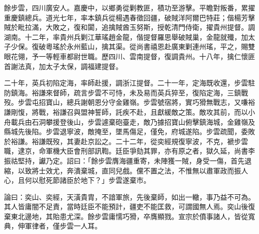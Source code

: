 \begin{pinyinscope}
餘步雲，四川廣安人。嘉慶中，以鄉勇從剿教匪，積功至游擊。平瞻對叛番，累擢重慶鎮總兵。道光七年，率本鎮兵從楊遇春徵回疆，破賊洋阿爾巴特莊；偕楊芳擊賊於毗拉滿，大敗之，復和闐，追擒賊酋玉努斯，授乾清門侍衛，擢貴州提督。調湖南。十二年，率貴州兵剿江華瑤趙金龍，偕提督羅思舉破賊巢，金龍就殲，加太子少保。復破粵瑤於永州藍山，擒其渠。從尚書禧恩赴廣東剿連州瑤，平之，賜雙眼花翎，予一等輕車都尉世職。歷四川、雲南提督，復調貴州。十八年，擒仁懷匪首謝法真，加太子太保，調福建提督。

二十年，英兵初陷定海，率師赴援，調浙江提督。二十一年，定海既收還，步雲駐防鎮海。裕謙來督師，疏言步雲不可恃，未及易而英兵猝至，復陷定海，三鎮戰歿。步雲屯招寶山，總兵謝朝恩分守金雞嶺。步雲號宿將，實巧猾無戰志，又嗛裕謙剛愎，將戰，裕謙召與盟神誓師，託疾不赴，且獻緩敵之策。敵攻其前，而以小舟載兵由石洞攀援登後山，步雲遽棄砲臺走，敵乃據招寶山俯擊鎮海城，金雞嶺及縣城先後陷。步雲退寧波，敵掩至，墜馬傷足，僅免，府城遂陷。步雲疏聞，委敗於裕謙。裕謙既歿，其妻赴京訟之。二十二年，從奕經規復寧波，不克，褫步雲職，逮京，命軍機大臣會刑部訊鞫。廷臣爭劾其罪，亦有原之者，獄久延，尚書李振祜堅持，讞乃定。詔曰：「餘步雲膺海疆重寄，未陣獲一賊，身受一傷，首先退縮，以致將士效尤，奔潰棄城，直同兒戲。儻不置之法，不惟無以肅軍政而振人心，且何以慰死節諸臣於地下？」步雲遂棄市。

論曰：奕山、奕經，天潢貴胄，不諳軍旅，先後棄師，如出一轍，事乃益不可為。其人皆庸闇不足責，當時廷臣不能預計，疆吏不能匡救，可謂國無人焉。奕山後復棄東北邊地，其貽患尤深。餘步雲庸懦巧猾，卒膺顯戮。宣宗於僨事諸人，皆從寬典，伸軍律者，僅步雲一人耳。


\end{pinyinscope}
